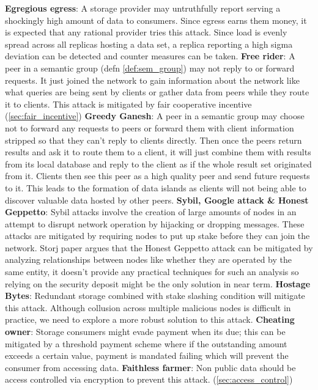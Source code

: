 \textbf{Egregious egress}: A storage provider may untruthfully report serving a shockingly high amount of data to consumers. Since egress earns them money, it is expected that any rational provider tries this attack. Since load is evenly spread across all replicas hosting a data set, a replica reporting a high sigma deviation can be detected and counter measures can be taken. 
\newline\newline
\textbf{Free rider}: A peer in a semantic group (defn \ref{def:sem_group}) may not reply to or forward requests. It just joined the network to gain information about the network like what queries are being sent by clients or gather data from peers while they route it to clients. This attack is mitigated by fair cooperative incentive (\cref{sec:fair_incentive})
\newline\newline
\textbf{Greedy Ganesh}: A peer in a semantic group may choose not to forward any requests to peers or forward them with client information stripped so that they can't reply to clients directly. Then once the peers return results and ask it to route them to a client, it will just combine them with results from its local database and reply to the client as if the whole result set originated from it. Clients then see this peer as a high quality peer and send future requests to it. This leads to the formation of data islands as clients will not being able to discover valuable data hosted by other peers.
\newline\newline
\textbf{Sybil, Google attack \& Honest Geppetto}: Sybil attacks involve the creation of large amounts of nodes in an attempt to disrupt network operation by hijacking or dropping messages. These attacks are mitigated by requiring nodes to put up stake before they can join the network. Storj paper argues that the Honest Geppetto attack can be mitigated by analyzing relationships between nodes like whether they are operated by the same entity, it doesn't provide any practical techniques for such an analysis so relying on the security deposit might be the only solution in near term.
\newline\newline
\textbf{Hostage Bytes}: Redundant storage combined with stake slashing condition will mitigate this attack. Although collusion across multiple malicious nodes is difficult in practice, we need to explore a more robust solution to this attack.
\newline\newline
\textbf{Cheating owner}: Storage consumers might evade payment when its due; this can be mitigated by a threshold payment scheme where if the outstanding amount exceeds a certain value, payment is mandated failing which will prevent the consumer from accessing data.
\newline\newline
\textbf{Faithless farmer}: Non public data should be access controlled via encryption to prevent this attack. (\cref{sec:access_control}) 